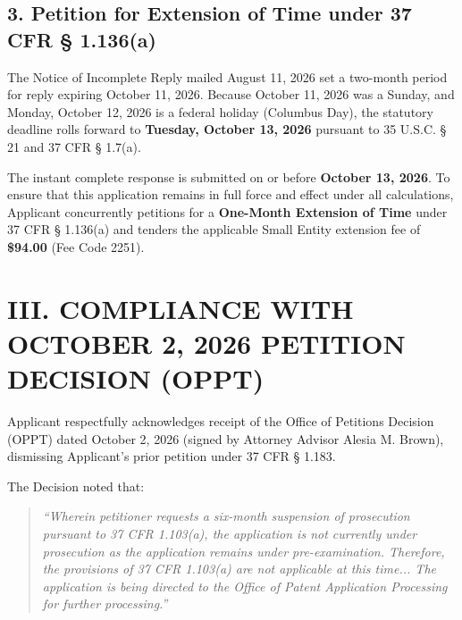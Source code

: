 \documentclass[11pt,letterpaper]{article}
\begin{document}
\subsection*{3. Petition for Extension of Time under 37 CFR \S{} 1.136(a)}

The Notice of Incomplete Reply mailed August 11, 2026 set a two-month period for reply expiring October 11, 2026. Because October 11, 2026 was a Sunday, and Monday, October 12, 2026 is a federal holiday (Columbus Day), the statutory deadline rolls forward to \textbf{Tuesday, October 13, 2026} pursuant to 35 U.S.C. \S{} 21 and 37 CFR \S{} 1.7(a). 

The instant complete response is submitted on or before \textbf{October 13, 2026}. To ensure that this application remains in full force and effect under all calculations, Applicant concurrently petitions for a \textbf{One-Month Extension of Time} under 37 CFR \S{} 1.136(a) and tenders the applicable Small Entity extension fee of \textbf{\$94.00} (Fee Code 2251).

\newpage

\section*{III. COMPLIANCE WITH OCTOBER 2, 2026 PETITION DECISION (OPPT)}

Applicant respectfully acknowledges receipt of the Office of Petitions Decision (OPPT) dated October 2, 2026 (signed by Attorney Advisor Alesia M. Brown), dismissing Applicant's prior petition under 37 CFR \S{} 1.183. 

The Decision noted that:
\begin{quote}
\textit{``Wherein petitioner requests a six-month suspension of prosecution pursuant to 37 CFR 1.103(a), the application is not currently under prosecution as the application remains under pre-examination. Therefore, the provisions of 37 CFR 1.103(a) are not applicable at this time... The application is being directed to the Office of Patent Application Processing for further processing.''}
\end{quote}
\end{document}
